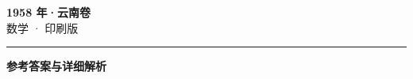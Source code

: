 \documentclass[zihao=5, a4paper]{ctexart}
\begin{document}
\begin{center}
  {\Large\bfseries 1958 年·云南卷}\\[4pt]
  {\large 数学 · 印刷版}
\end{center}
\medskip
{}

\par\bigskip\hrule\bigskip
{}
\begin{center}{\large\bfseries 参考答案与详细解析}\end{center}
\smallskip

\end{document}
